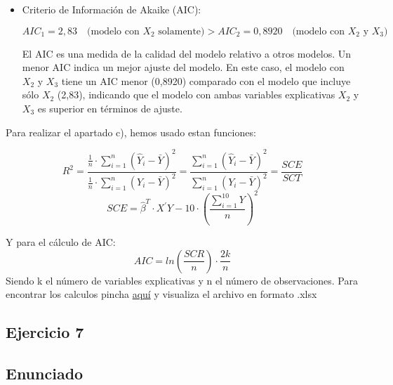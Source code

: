 \documentclass[a4paper,12pt]{article}
\begin{document}
\begin{itemize}
\begin{itemize}
    \item Criterio de Información de Akaike (AIC):
    

\[
    AIC_1 = 2,83 \quad \text{(modelo con \(X_2\) solamente)} > AIC_2 = 0,8920 \quad \text{(modelo con \(X_2\) y \(X_3\))}
    \]


    El AIC es una medida de la calidad del modelo relativo a otros modelos. Un menor AIC indica un mejor ajuste del modelo. En este caso, el modelo con \(X_2\) y \(X_3\) tiene un AIC menor (0,8920) comparado con el modelo que incluye sólo \(X_2\) (2,83), indicando que el modelo con ambas variables explicativas \(X_2\) y \(X_3\) es superior en términos de ajuste.
  \end{itemize}
\end{itemize}

Para realizar el apartado c), hemos usado estan funciones:

     \begin{equation}
        R^2 = \frac{\frac{1}{n} \cdot \sum_{i=1}^{n} \left( \hat{Y}_i - \bar{Y} \right)^2}{\frac{1}{n} \cdot \sum_{i=1}^{n} \left( Y_i - \bar{Y} \right)^2} = \frac{\sum_{i=1}^{n} \left( \hat{Y}_i - \bar{Y} \right)^2}{\sum_{i=1}^{n} \left( Y_i - \bar{Y} \right)^2} = \frac{SCE}{SCT}
        \end{equation}
     \begin{equation}
        SCE = \hat{\beta}^{T} \cdot X^{\prime}Y - 10 \cdot \left(\frac{\sum_{i=1}^{10}Y}{n}\right)^{2}    
    \end{equation}

    
    
Y para el cálculo de AIC:
\begin{equation}
    AIC = ln (\frac{SCR}{n}) \cdot \frac{2k}{n}
\end{equation}
Siendo k el número de variables explicativas y n el número de observaciones.
Para encontrar los calculos pincha \href{https://github.com/ElblogdeIsmael/ElblogdeIsmael.github.io/tree/main/Asignaturas/Tercer%20A%C3%B1o/ECO/Practicas/EjerciciosPropuestos/SolucionesEjercicios/Tema2}{aquí} y visualiza el archivo en formato .xlsx

\subsection{Ejercicio 7}
\subsection*{Enunciado}
\end{document}
